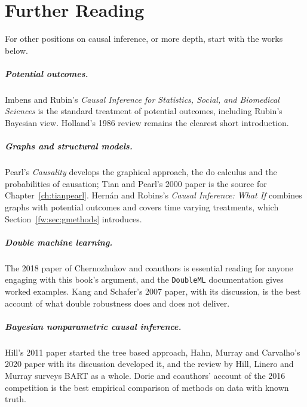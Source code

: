 \chapter*{Further Reading}

For other positions on causal inference, or more depth, start with the works below.

\paragraph{Potential outcomes.} Imbens and Rubin's \emph{Causal Inference for Statistics, Social, and Biomedical Sciences} is the standard treatment of potential outcomes, including Rubin's Bayesian view. Holland's 1986 review remains the clearest short introduction.

\paragraph{Graphs and structural models.} Pearl's \emph{Causality} develops the graphical approach, the do calculus and the probabilities of causation; Tian and Pearl's 2000 paper is the source for Chapter~\ref{ch:tianpearl}. Hern\'an and Robins's \emph{Causal Inference: What If} combines graphs with potential outcomes and covers time varying treatments, which Section~\ref{fw:sec:gmethods} introduces.

\paragraph{Double machine learning.} The 2018 paper of Chernozhukov and coauthors is essential reading for anyone engaging with this book's argument, and the \texttt{DoubleML} documentation gives worked examples. Kang and Schafer's 2007 paper, with its discussion, is the best account of what double robustness does and does not deliver.

\paragraph{Bayesian nonparametric causal inference.} Hill's 2011 paper started the tree based approach, Hahn, Murray and Carvalho's 2020 paper with its discussion developed it, and the review by Hill, Linero and Murray surveys BART as a whole. Dorie and coauthors' account of the 2016 competition is the best empirical comparison of methods on data with known truth.

